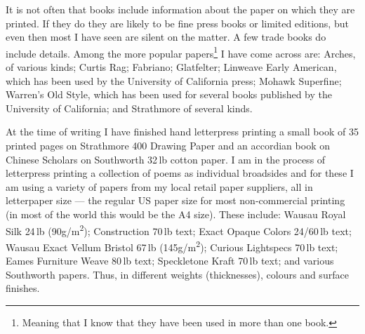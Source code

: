 \documentclass[10pt,a4paper,oneside,extrafontsizes]{memoir}%
\newcommand*{\sqrd}[1]{#1\textsuperscript{2}}
\newcommand*{\gsm}{g/\sqrd{m}}
\newcommand\U[2]{\textrm{#1}\,\textrm{#2}}
\begin{document}

\begin{paracol}{2}
\switchEng
    It is not often that books include information about the paper on which
they are printed. If they do they are likely to be fine press books or 
limited editions, but even then most I have seen are silent on the matter. 
A few trade books do include details. Among the more popular 
papers\footnote{Meaning that I know that they have been used in more than
one book.} I have
come across are: 
Arches, of various kinds; 
Curtis Rag;
Fabriano;
Glatfelter;
Linweave Early American, which
has been used by the University of California press;
Mohawk Superfine;
Warren's Old Style, which has been used for 
several books published by the University of California; and 
Strathmore of several kinds.

   At the time of writing I have finished hand letterpress printing a 
small book of 35 printed pages on Strathmore 400 Drawing Paper and an 
accordian book on Chinese Scholars on Southworth 
\U{32}{lb} cotton paper. I am in the process of letterpress printing a collection
of poems as individual broadsides and for these I am using a variety of
papers from my local retail paper suppliers, all in letterpaper size ---
the regular US paper size for most non-commercial printing (in most of the 
world this would be the A4 size). These include: Wausau Royal Silk \U{24}{lb}
(90\gsm);
Construction \U{70}{lb} text; Exact Opaque Colors 24/\U{60}{lb} text; Wausau Exact 
Vellum Bristol \U{67}{lb} (145\gsm); Curious Lightspecs \U{70}{lb} text; Eames Furniture
Weave \U{80}{lb} text; Speckletone Kraft \U{70}{lb} text; and various Southworth papers. 
Thus, in different weights (thicknesses), colours and surface finishes.
\end{paracol}
\end{document}
